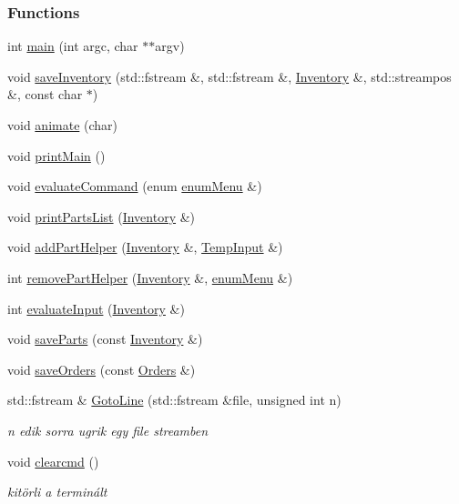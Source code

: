 \subsubsection*{Functions}
\begin{DoxyCompactItemize}
\item 
int \mbox{\hyperlink{main_8h_a3c04138a5bfe5d72780bb7e82a18e627}{main}} (int argc, char $\ast$$\ast$argv)
\item 
void \mbox{\hyperlink{main_8h_a5e4e191ea94a60b35aab49d49b978f77}{save\+Inventory}} (std\+::fstream \&, std\+::fstream \&, \mbox{\hyperlink{class_inventory}{Inventory}} \&, std\+::streampos \&, const char $\ast$)
\item 
void \mbox{\hyperlink{main_8h_ac83102103dbe7ba03fa00ab462055a6f}{animate}} (char)
\item 
void \mbox{\hyperlink{main_8h_aa8348016f7273e63d47917126e8f9c69}{print\+Main}} ()
\item 
void \mbox{\hyperlink{main_8h_aed630b39565f9b935d3148b396fd862d}{evaluate\+Command}} (enum \mbox{\hyperlink{main_8h_adbc27074b7dcd54cd4578936c6329d02}{enum\+Menu}} \&)
\item 
void \mbox{\hyperlink{main_8h_a54c74422af05849f9d508c0a5ccd468b}{print\+Parts\+List}} (\mbox{\hyperlink{class_inventory}{Inventory}} \&)
\item 
void \mbox{\hyperlink{main_8h_af60ea04d4030a9371dd4d0dd61a0531f}{add\+Part\+Helper}} (\mbox{\hyperlink{class_inventory}{Inventory}} \&, \mbox{\hyperlink{struct_temp_input}{Temp\+Input}} \&)
\item 
int \mbox{\hyperlink{main_8h_a05031fafa43df25734364a97085b66be}{remove\+Part\+Helper}} (\mbox{\hyperlink{class_inventory}{Inventory}} \&, \mbox{\hyperlink{main_8h_adbc27074b7dcd54cd4578936c6329d02}{enum\+Menu}} \&)
\item 
int \mbox{\hyperlink{main_8h_a0e552edf6cae51d6a38ad105b2c29edb}{evaluate\+Input}} (\mbox{\hyperlink{class_inventory}{Inventory}} \&)
\item 
void \mbox{\hyperlink{main_8h_ae1fd94f91e6af6d41057704277c9d9e6}{save\+Parts}} (const \mbox{\hyperlink{class_inventory}{Inventory}} \&)
\item 
void \mbox{\hyperlink{main_8h_a91fe9752814ecad7d04d2cf550123d17}{save\+Orders}} (const \mbox{\hyperlink{class_orders}{Orders}} \&)
\item 
std\+::fstream \& \mbox{\hyperlink{main_8h_aac067d016b66218b6d8e0578bc214ef0}{Goto\+Line}} (std\+::fstream \&file, unsigned int n)
\begin{DoxyCompactList}\small\item\em n edik sorra ugrik egy file streamben \end{DoxyCompactList}\item 
void \mbox{\hyperlink{main_8h_aaa6e5fc0d7c515998e48fe6ae944ca40}{clearcmd}} ()
\begin{DoxyCompactList}\small\item\em kitörli a terminált \end{DoxyCompactList}\end{DoxyCompactItemize}


